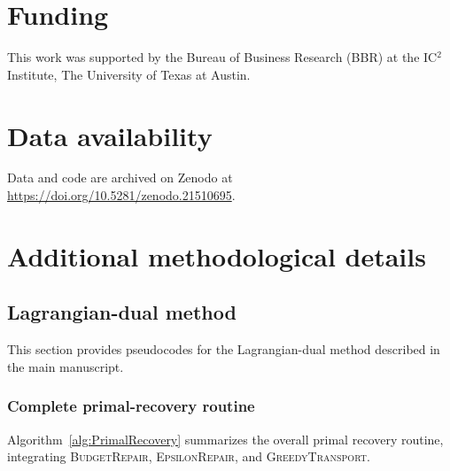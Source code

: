 \documentclass[preprint,11pt,authoryear]{elsarticle}
\begin{document}
\section*{Funding}
This work was supported by the Bureau of Business Research (BBR) at the IC$^2$ Institute, The University of Texas at Austin.

\section*{Data availability}
Data and code are archived on Zenodo at
\url{https://doi.org/10.5281/zenodo.21510695}.

\clearpage
\appendix

\renewcommand{\thesection}{S\arabic{section}}
\renewcommand{\thefigure}{S\arabic{figure}}
\renewcommand{\thetable}{S\arabic{table}}
\renewcommand{\theequation}{S\arabic{equation}}

\setcounter{section}{0}
\setcounter{figure}{0}
\setcounter{table}{0}
\setcounter{equation}{0}

\section{Additional methodological details}

\subsection{Lagrangian-dual method}
\label{sec:supp_ld_details}

This section provides pseudocodes for the Lagrangian-dual method described in the main manuscript.

\subsubsection{Complete primal-recovery routine}
\label{sec:supp_ld_primal}

Algorithm~\ref{alg:PrimalRecovery} summarizes the overall primal recovery routine, integrating \textsc{BudgetRepair}, \textsc{EpsilonRepair}, and \textsc{GreedyTransport}.
\end{document}
